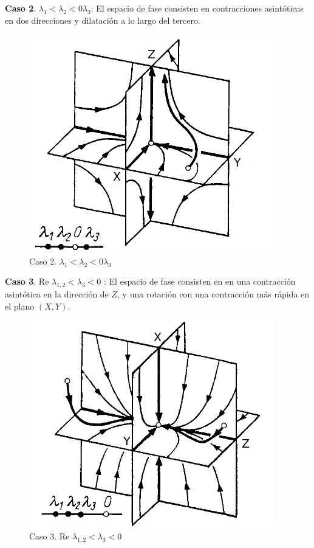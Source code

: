 \documentclass[a4paper,10pt]{article}
\begin{document}
\textbf{Caso 2}. $\lambda_1 < \lambda_2 < 0 \lambda_3$: El espacio de fase consisten en contracciones asintóticas
en dos direcciones y dilatación a lo largo del tercero.

\begin{figure}[h]
 \centering
\includegraphics[scale=0.3]{problema3fig3}
\caption{Caso 2. $\lambda_1 < \lambda_2 < 0 \lambda_3$}
\label{fig:problema3fig3}
\end{figure}
\vspace{.3cm}

\textbf{Caso 3}. Re $\lambda_{1,2} < \lambda_3 < 0$ : El espacio de fase consisten en en una contracción asintótica
en la dirección de $Z$, y una rotación con una contracción más rápida en el plano
$(X,Y)$.

\begin{figure}[h]
 \centering
\includegraphics[scale=0.3]{problema3fig2}
\caption{Caso 3. Re $\lambda_{1,2} < \lambda_3 < 0$}
\label{fig:problema3fig4}
\end{figure}
\vspace{.3cm}
\end{document}
